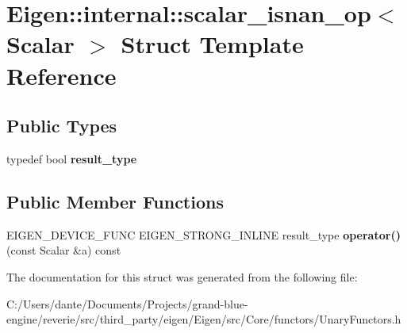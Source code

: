 \hypertarget{struct_eigen_1_1internal_1_1scalar__isnan__op}{}\section{Eigen\+::internal\+::scalar\+\_\+isnan\+\_\+op$<$ Scalar $>$ Struct Template Reference}
\label{struct_eigen_1_1internal_1_1scalar__isnan__op}
\subsection*{Public Types}
\begin{DoxyCompactItemize}
\item 
\mbox{\label{struct_eigen_1_1internal_1_1scalar__isnan__op_aba50210fe6c49ab02ebc00420fc4db6b}} 
typedef bool {\bfseries result\+\_\+type}
\end{DoxyCompactItemize}
\subsection*{Public Member Functions}
\begin{DoxyCompactItemize}
\item 
\mbox{\label{struct_eigen_1_1internal_1_1scalar__isnan__op_a57a5813e4bf9259acbeb41ad053f37c4}} 
E\+I\+G\+E\+N\+\_\+\+D\+E\+V\+I\+C\+E\+\_\+\+F\+U\+NC E\+I\+G\+E\+N\+\_\+\+S\+T\+R\+O\+N\+G\+\_\+\+I\+N\+L\+I\+NE result\+\_\+type {\bfseries operator()} (const Scalar \&a) const
\end{DoxyCompactItemize}


The documentation for this struct was generated from the following file\+:\begin{DoxyCompactItemize}
\item 
C\+:/\+Users/dante/\+Documents/\+Projects/grand-\/blue-\/engine/reverie/src/third\+\_\+party/eigen/\+Eigen/src/\+Core/functors/Unary\+Functors.\+h\end{DoxyCompactItemize}

